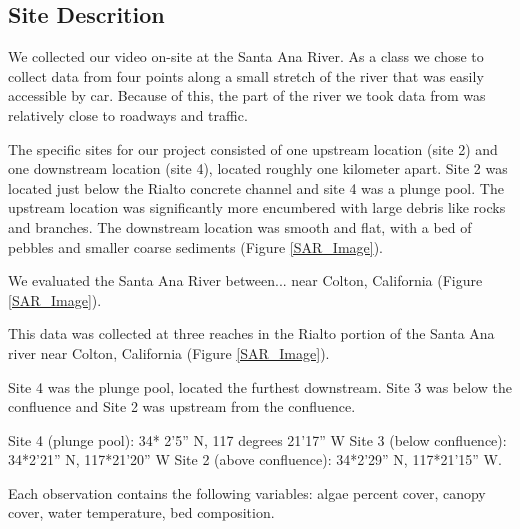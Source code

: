 \documentclass{article}\usepackage[]{graphicx}\usepackage[]{color}
\begin{document}
\subsection{Site Descrition}

We collected our video on-site at the Santa Ana River. As a class we chose to collect data from four points along a small stretch of the river that was easily accessible by car. Because of this, the part of the river we took data from was relatively close to roadways and traffic. 

The specific sites for our project consisted of one upstream location (site 2) and one downstream location (site 4), located roughly one kilometer apart. Site 2 was located just below the Rialto concrete channel and site 4 was a plunge pool. The upstream location was significantly more encumbered with large debris like rocks and branches. The downstream location was smooth and flat, with a bed of pebbles and smaller coarse sediments (Figure \ref{SAR_Image}). 

We evaluated the Santa Ana River between... near Colton, California (Figure \ref{SAR_Image}). 

This data was collected at three reaches in the Rialto portion of the Santa Ana river near Colton, California (Figure \ref{SAR_Image}).

Site 4 was the plunge pool, located the furthest downstream. Site 3 was below the confluence and Site 2 was upstream from the confluence. 


Site 4 (plunge pool): 34* 2’5” N, 117 degrees 21’17” W 
Site 3 (below conﬂuence): 34*2’21” N, 117*21’20” W 
Site 2 (above conﬂuence): 34*2’29” N, 117*21’15” W. 

Each observation contains the following variables: algae percent cover, canopy cover, water temperature, bed composition.  
\end{document}
